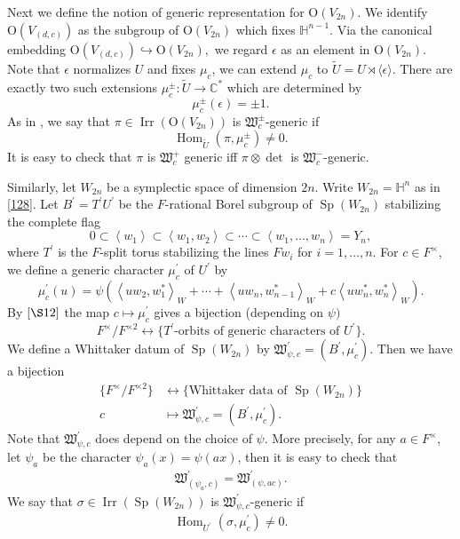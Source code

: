 \documentclass[article]{article}
\numberwithin{equation}{section}
\theoremstyle{definition}
\DeclareMathOperator{\Hom}{Hom}
\DeclareMathOperator{\SP}{Sp}
\DeclareMathOperator{\Irr}{Irr}
\begin{document}
Next we define the notion of generic representation for $\mathrm O(V_{2n})$. We identify $\mathrm{O}\left(V_{(d, c)}\right)$ as the subgroup of $\mathrm{O}\left(V_{2 n}\right)$ which fixes $\mathbb{H}^{n-1} $. Via the canonical embedding $\mathrm{O}\left(V_{(d, c)}\right) \hookrightarrow \mathrm{O}\left(V_{2 n}\right),$ we regard $\epsilon$ as an element in $\mathrm{O}\left(V_{2 n}\right)$. Note that $\epsilon$ normalizes $U$ and fixes $\mu_{c}$, we can extend $\mu_{c}$ to $\widetilde{U}=U \rtimes\langle\epsilon\rangle$. There are exactly two such extensions $\mu_{c}^{\pm} : \widetilde{U} \rightarrow \mathbb{C}^{*}$ which are determined by
 $$\mu_{c}^{\pm}\left(\epsilon\right)=\pm 1.$$
 As in \cite[\S 2.2]{MR3708200}, we say that $\pi\in \Irr(\mathrm{O}(V_{2n}))$ is $\mathfrak W_c^{\pm}$-generic if
 $$\Hom_{\widetilde{U}}(\pi, \mu_{c}^{\pm}) \neq 0.$$
 It is easy to check that $\pi$ is $\mathfrak W_c^+$ generic iff $\pi\otimes\det$ is $\mathfrak W_c^-$-generic. 


Similarly, let $W_{2n}$ be a symplectic space of dimension $2n$. Write $W_{2n}=\mathbb H^n$ as in \ref{128}. Let $B^{\prime}=T^{\prime} U^{\prime}$ be the $F$-rational Borel subgroup of $\SP(W_{2n})$ stabilizing the complete flag
$$0 \subset\left\langle w_{1}\right\rangle \subset\left\langle w_{1}, w_{2}\right\rangle \subset \cdots \subset\left\langle w_{1}, \ldots, w_{n}\right\rangle= Y_{n},$$
where $T^{\prime}$ is the $F$-split torus stabilizing the lines $F w_{i}$ for $i=1, \ldots, n $. For $c \in F^{\times}$, we define a generic
character $\mu_{c}^{\prime}$ of $U^{\prime}$ by
$$\mu_{c}^{\prime}(u)=\psi\left(\left\langle uw_{2}, w_{1}^{*}\right\rangle_{W}+\cdots+\left\langle u w_{n}, w_{n-1}^{*}\right\rangle_{W}+c\left\langle u w_{n}^{*}, w_{n}^{*}\right\rangle_{W}\right).$$
By \cite{MR3202556} $[\S 12]$ the map $c \mapsto \mu_{c}^{\prime}$ gives a bijection (depending on $\psi )$
$$F^{\times}/F^{\times 2} \longleftrightarrow \{\mbox{$T^{\prime}$-orbits of generic characters of $U^{\prime}$}\}.$$
We define a Whittaker datum of $\SP(W_{2n})$ by $\mathfrak W^\prime_{\psi,c}=(B^\prime,\mu^\prime_c)$. Then we have a bijection 
\begin{align*}
\{F^{\times} /F^{\times 2}\}&\longleftrightarrow  \{\mbox{Whittaker data of $\SP(W_{2n})$}\}\\
c &\mapsto \mathfrak W^\prime_{\psi,c}= (B^\prime,\mu^\prime_c).
\end{align*}
Note that $\mathfrak W^\prime_{\psi,c}$ does depend on the choice of $\psi$. More precisely, for any $a\in F^\times $, let $\psi_a$ be the character $\psi_a(x)=\psi(ax)$, then it is easy to check that 
\begin{align}\label{121}
\mathfrak W^{\prime}_{(\psi_a,c)}= \mathfrak W^{\prime}_{(\psi,ac)}. 
\end{align}
We say that $\sigma\in \Irr(\SP(W_{2n}))$ is $\mathfrak W_{\psi,c}^\prime$-generic if 
\begin{align*}
\Hom_{U^\prime}(\sigma, \mu^\prime_c)\neq 0.
\end{align*}
\end{document}
